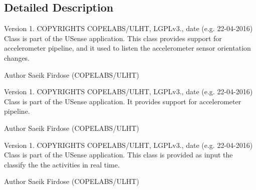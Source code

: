 \subsection{Detailed Description}
\begin{DoxyVersion}{Version}
1. C\+O\+P\+Y\+R\+I\+G\+H\+T\+S C\+O\+P\+E\+L\+A\+B\+S/\+U\+L\+H\+T, L\+G\+P\+Lv3., date (e.\+g. 22-\/04-\/2016) Class is part of the U\+Sense application. This class provides support for accelerometer pipeline, and it used to listen the accelerometer sensor orientation changes. 
\end{DoxyVersion}
\begin{DoxyAuthor}{Author}
Saeik Firdose (C\+O\+P\+E\+L\+A\+B\+S/\+U\+L\+H\+T)
\end{DoxyAuthor}
\begin{DoxyVersion}{Version}
1. C\+O\+P\+Y\+R\+I\+G\+H\+T\+S C\+O\+P\+E\+L\+A\+B\+S/\+U\+L\+H\+T, L\+G\+P\+Lv3., date (e.\+g. 22-\/04-\/2016) Class is part of the U\+Sense application. It provides support for accelerometer pipeline. 
\end{DoxyVersion}
\begin{DoxyAuthor}{Author}
Saeik Firdose (C\+O\+P\+E\+L\+A\+B\+S/\+U\+L\+H\+T)
\end{DoxyAuthor}
\begin{DoxyVersion}{Version}
1. C\+O\+P\+Y\+R\+I\+G\+H\+T\+S C\+O\+P\+E\+L\+A\+B\+S/\+U\+L\+H\+T, L\+G\+P\+Lv3., date (e.\+g. 22-\/04-\/2016) Class is part of the U\+Sense application. This class is provided as input the classify the the activities in real time. 
\end{DoxyVersion}
\begin{DoxyAuthor}{Author}
Saeik Firdose (C\+O\+P\+E\+L\+A\+B\+S/\+U\+L\+H\+T) 
\end{DoxyAuthor}
